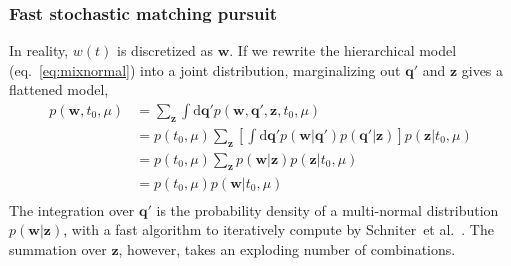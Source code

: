 \subsubsection{Fast stochastic matching pursuit}
\label{subsec:fsmp}
In reality, $w(t)$ is discretized as $\bm{w}$. If we rewrite the hierarchical model (eq.~\eqref{eq:mixnormal}) into a joint distribution, marginalizing out $\bm{q}'$ and $\bm{z}$ gives a flattened model,
\begin{equation}
  \label{eq:universe}
  \begin{aligned}
    p(\bm{w}, t_0, \mu) &= \sum_{\bm{z}} \int \mathrm{d}\bm{q}' p(\bm{w}, \bm{q}', \bm{z}, t_0, \mu) \\
    &= p(t_0, \mu) \sum_{\bm{z}} \left[\int \mathrm{d}\bm{q}' p(\bm{w}|\bm{q}') p(\bm{q}'|\bm{z}) \right] p(\bm{z}|t_0, \mu) \\
    &= p(t_0, \mu) \sum_{\bm{z}} p(\bm{w}|\bm{z}) p(\bm{z}|t_0, \mu) \\
    &= p(t_0, \mu) p(\bm{w}|t_0, \mu) \\
  \end{aligned}
\end{equation}
The integration over $\bm{q}'$ is the probability density of a multi-normal distribution $p(\bm{w}|\bm{z})$, with a fast algorithm to iteratively compute by Schniter~et al.~\cite{schniter_fast_2008}. The summation over $\bm{z}$, however, takes an exploding number of combinations.

